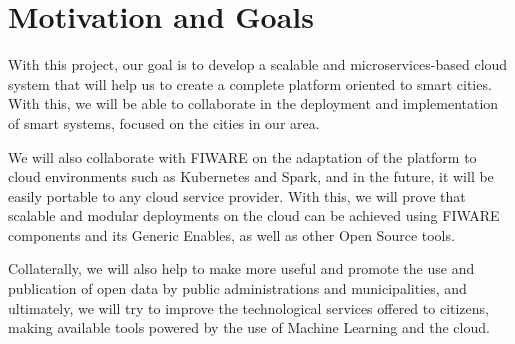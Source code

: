 \chapter{Motivation and Goals}
\label{chapter:Motivation}

With this project, our goal is to develop a scalable and microservices-based cloud system that will help us to create a complete platform oriented to smart cities. With this, we will be able to collaborate in the deployment and implementation of smart systems, focused on the cities in our area.

We will also collaborate with FIWARE on the adaptation of the platform to cloud environments such as Kubernetes and Spark, and in the future, it will be easily portable to any cloud service provider. With this, we will prove that scalable and modular deployments on the cloud can be achieved using FIWARE components and its Generic Enables, as well as other Open Source tools.

Collaterally, we will also help to make more useful and promote the use and publication of open data by public administrations and municipalities, and ultimately, we will try to improve the technological services offered to citizens, making available tools powered by the use of Machine Learning and the cloud.

